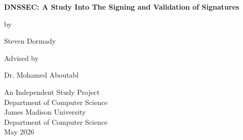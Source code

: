 \begin{titlepage}
\centering

\vspace*{1in}

{\Large\bfseries DNSSEC: A Study Into The Signing and Validation of Signatures\par}
\vspace{0.75in}

by\par
\vspace{0.15in}
{\Large Steven Dormady\par}

\vspace{0.1in}
Advised by\par
\vspace{0.15in}
{\Large Dr. Mohamed Aboutabl\par}

\vfill

An Independent Study Project\\
Department of Computer Science\\
James Madison University\\
\vspace{0.3in}
Department of Computer Science\\
\vspace{0.3in}
May 2026

\end{titlepage}
